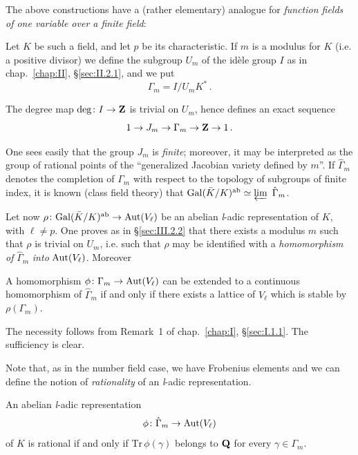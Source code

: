 
The above constructions have a (rather elementary) analogue for
\emph{function fields of one variable over a finite field}:

Let $K$ be such a field, and let $p$ be its characteristic.  If $m$ is a
modulus for $K$ (i.e. a positive divisor) we define the subgroup $U_m$ of
the idèle group $I$ as in chap.~\ref{chap:II}, \S\ref{sec:II.2.1}, and we
put
\[
\Gamma_m = I/U_mK^*\,.
\]

The degree map $\mathrm{deg}\colon I\to\mathbf{Z}$ is trivial on $U_m$, hence
defines an exact sequence
\[
1 \to J_m \to \Gamma_m \to \mathbf{Z} \to 1\,.
\]

One sees easily that the group $J_m$ is \emph{finite}; moreover, it may
be interpreted as the group of rational points of the ``generalized
Jacobian variety defined by $m$''.  If $\hat{\Gamma}_m$ denotes the
completion of $\Gamma_m$ with respect to the topology of subgroups of
finite index, it is known (class field theory) that
$\mathrm{Gal}(\bar K/K)^{\mathrm{ab}} \simeq \varprojlim\ \hat{\Gamma}_m$.

Let now $\rho\colon \mathrm{Gal}(\bar K/K)^{\mathrm{ab}}\to\mathrm{Aut}(V_\ell)$ be an
abelian \textit{l}-adic representation of $K$, with $\ell\neq p$.  One
proves as in \S\ref{sec:III.2.2} that there exists a modulus $m$ such
that $\rho$ is trivial on $U_m$, i.e. such that $\rho$ may be identified
with a \emph{homomorphism of} $\hat{\Gamma}_m$ \emph{into}
$\mathrm{Aut}(V_\ell)$.  Moreover

\begin{proposition}
A homomorphism $\phi\colon \Gamma_m \to \mathrm{Aut}(V_\ell)$ can be extended to
a continuous homomorphism of $\hat{\Gamma}_m$ if and only if there exists
a lattice of $V_\ell$ which is stable by $\rho(\Gamma_m)$.
\end{proposition}

The necessity follows from Remark~1 of chap.~\ref{chap:I},
\S\ref{sec:I.1.1}.  The sufficiency is clear.

Note that, as in the number field case, we have Frobenius elements and we
can define the notion of \emph{rationality} of an \textit{l}-adic
representation.

\begin{theorem}
An abelian \textit{l}-adic representation
\[
\phi\colon \hat{\Gamma}_m \to \mathrm{Aut}(V_\ell)
\]
of $K$ is rational if and only if $\mathrm{Tr}\,\phi(\gamma)$ belongs to
$\mathbf{Q}$ for every $\gamma\in\Gamma_m$.
\end{theorem}


